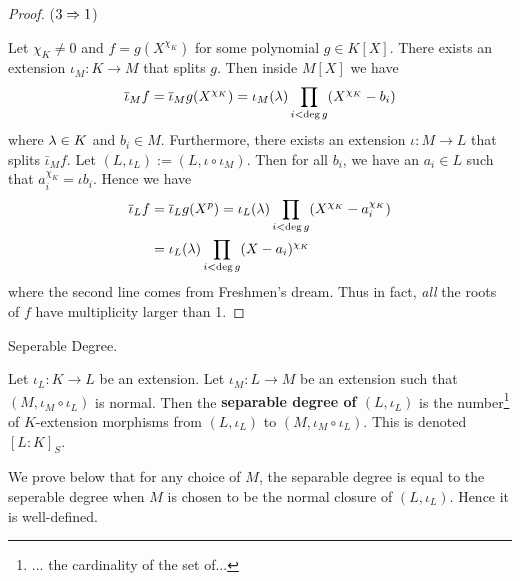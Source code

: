 \documentclass[../book.tex]{subfiles}
\begin{document}
\begin{proof}
    ($3\Rightarrow 1$)
    
        Let $\chi_K \neq 0$ and $f = g(X^{\chi_K})$
        for some polynomial $g \in K[X]$.
        There exists an extension $\iota_M : K \to M$ that splits $g$. 
        Then inside $M[X]$ we have \[
            \overline{\iota}_M f = \overline{\iota}_M g(X^{\chi_K})
            = \iota_M(\lambda) \prod_{i < \deg g} (X^{\chi_K} - b_i)
        \]
        where $\lambda \in K$ and $b_i \in M$. 
        Furthermore, there exists an extension $\iota : M \to L$ 
        that splits $\bar\iota_M f$.
        Let $(L,\iota_L) := (L,\iota\circ\iota_M)$. 
        Then for all $b_i$, we have an $a_i \in L$ such that $a_i^{\chi_K} = \iota b_i$. 
        Hence we have \begin{align*}
            \overline{\iota}_L f &= \overline{\iota}_L g(X^p) 
            = \iota_L(\lambda) \prod_{i < \deg g}  (X^{\chi_K} - a_i^{\chi_K}) \\
            &= \iota_L(\lambda) \prod_{i < \deg g}  (X - a_i)^{\chi_K}  
        \end{align*}
        where the second line comes from Freshmen's dream. 
        Thus in fact, \emph{all} the roots of $f$ have multiplicity larger than 1. 
\end{proof}
\begin{dfn} Seperable Degree. 
    
    Let $\iota_L : K \to L$ be an extension. 
    Let $\iota_M : L \to M$ be an extension such that 
    $(M,\iota_M\circ\iota_L)$ is normal. 
    Then the \textbf{separable degree of $(L,\iota_L)$} is
    the number\footnote{... the cardinality of the set of...}
    of $K$-extension morphisms 
    from $(L,\iota_L)$ to $(M,\iota_M\circ\iota_L)$.
    This is denoted $[L : K]_S$. 
    
    We prove below that for any choice of $M$,
    the separable degree is equal to the seperable degree 
    when $M$ is chosen to be the normal closure of $(L,\iota_L)$.
    Hence it is well-defined.
\end{dfn}
\end{document}
